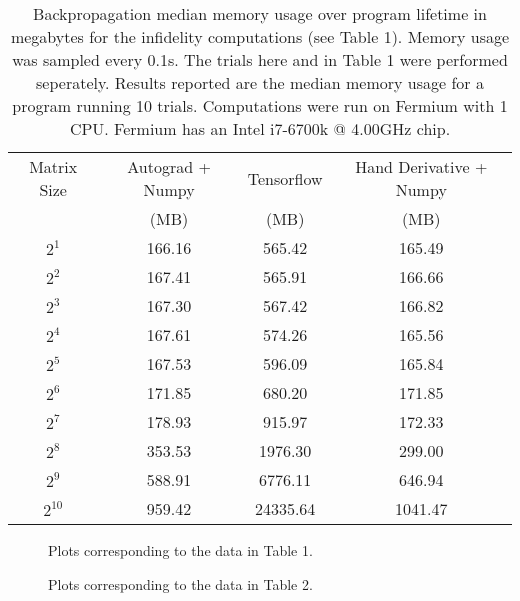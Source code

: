 \documentclass[letterpaper, 12pt]{article}
\begin{document}
\begin{table}
  \begin{center}
    \begin{tabular}{c | c | c | c}
      Matrix Size & Autograd + Numpy & Tensorflow & Hand Derivative + Numpy\\
                  & (MB)             & (MB)       & (MB)\\
      \hline
      $2^{1}$  &  166.16             &  565.42  &  165.49\\
      $2^{2}$  &  167.41             &  565.91  &  166.66\\
      $2^{3}$  &  167.30             &  567.42  &  166.82\\
      $2^{4}$  &  167.61             &  574.26  &  165.56\\
      $2^{5}$  &  167.53             &  596.09  &  165.84\\
      $2^{6}$  &  171.85             &  680.20  &  171.85\\
      $2^{7}$  &  178.93             &  915.97  &  172.33\\
      $2^{8}$  &  353.53             & 1976.30  &  299.00\\
      $2^{9}$  &  588.91             & 6776.11  &  646.94\\
      $2^{10}$ &  959.42             & 24335.64 & 1041.47\\
    \end{tabular}
  \end{center}
  \caption{Backpropagation median memory usage over program lifetime in megabytes for the infidelity computations (see Table 1). Memory usage was sampled every 0.1s. The trials here and in Table 1 were performed seperately. Results reported are the median memory usage for a program running 10 trials. Computations were run on Fermium with 1 CPU. Fermium has an Intel i7-6700k @ 4.00GHz chip.}
\end{table}

\begin{figure}
  \caption{Plots corresponding to the data in Table 1.}
\end{figure}

\begin{figure}
  \caption{Plots corresponding to the data in Table 2.}
\end{figure}
\end{document}
